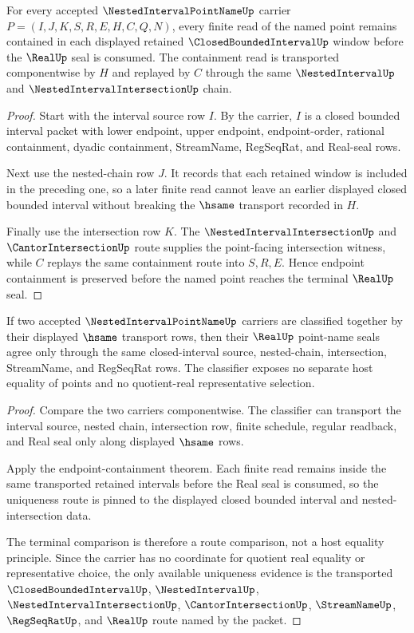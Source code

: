\begin{theorem}
\label{thm:nested-interval-point-name-endpoint-containment}
For every accepted $\NestedIntervalPointNameUp$ carrier $P=(I,J,K,S,R,E,H,C,Q,N)$, every finite read of the named point remains contained in each displayed retained $\ClosedBoundedIntervalUp$ window before the $\RealUp$ seal is consumed. The containment read is transported componentwise by $H$ and replayed by $C$ through the same $\NestedIntervalUp$ and $\NestedIntervalIntersectionUp$ chain.
\end{theorem}
\begin{proof}
Start with the interval source row $I$. By the carrier, $I$ is a closed bounded interval packet with lower endpoint, upper endpoint, endpoint-order, rational containment, dyadic containment, StreamName, RegSeqRat, and Real-seal rows.

Next use the nested-chain row $J$. It records that each retained window is included in the preceding one, so a later finite read cannot leave an earlier displayed closed bounded interval without breaking the $\hsame$ transport recorded in $H$.

Finally use the intersection row $K$. The $\NestedIntervalIntersectionUp$ and $\CantorIntersectionUp$ route supplies the point-facing intersection witness, while $C$ replays the same containment route into $S,R,E$. Hence endpoint containment is preserved before the named point reaches the terminal $\RealUp$ seal.
\end{proof}

\begin{theorem}
\label{thm:nested-interval-point-name-uniqueness-route}
If two accepted $\NestedIntervalPointNameUp$ carriers are classified together by their displayed $\hsame$ transport rows, then their $\RealUp$ point-name seals agree only through the same closed-interval source, nested-chain, intersection, StreamName, and RegSeqRat rows. The classifier exposes no separate host equality of points and no quotient-real representative selection.
\end{theorem}
\begin{proof}
Compare the two carriers componentwise. The classifier can transport the interval source, nested chain, intersection row, finite schedule, regular readback, and Real seal only along displayed $\hsame$ rows.

Apply the endpoint-containment theorem. Each finite read remains inside the same transported retained intervals before the Real seal is consumed, so the uniqueness route is pinned to the displayed closed bounded interval and nested-intersection data.

The terminal comparison is therefore a route comparison, not a host equality principle. Since the carrier has no coordinate for quotient real equality or representative choice, the only available uniqueness evidence is the transported $\ClosedBoundedIntervalUp$, $\NestedIntervalUp$, $\NestedIntervalIntersectionUp$, $\CantorIntersectionUp$, $\StreamNameUp$, $\RegSeqRatUp$, and $\RealUp$ route named by the packet.
\end{proof}

